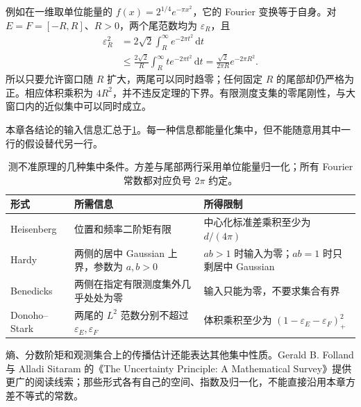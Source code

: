 例如在一维取单位能量的 \(f(x)=2^{1/4}e^{-\pi x^2}\)，它的 Fourier 变换等于自身。对 \(E=F=[-R,R]\)、\(R>0\)，两个尾范数均为 \(\varepsilon_R\)，且
\[
 \begin{aligned}
 \varepsilon_R^2
 &=2\sqrt2\int_R^\infty e^{-2\pi t^2}\,\mathrm dt\\
 &\leq\frac{2\sqrt2}{R}\int_R^\infty t e^{-2\pi t^2}\,\mathrm dt
 =\frac{\sqrt2}{2\pi R}e^{-2\pi R^2}.
 \end{aligned}
\]
所以只要允许窗口随 \(R\) 扩大，两尾可以同时趋零；任何固定 \(R\) 的尾部却仍严格为正。相应体积乘积为 \(4R^2\)，并不违反定理的下界。有限测度支集的零尾刚性，与大窗口内的近似集中可以同时成立。

\ProseParagraphBreak

本章各结论的输入信息汇总于\cref{b2:tab:20-uncertainty-forms}。每一种信息都能量化集中，但不能随意用其中一行的假设替代另一行。

\begin{table}[htbp]
\centering
\caption[测不准原理的几种集中条件]{测不准原理的几种集中条件。方差与尾部两行采用单位能量归一化；所有 Fourier 常数都对应负号 \(2\pi\) 约定。}
\label{b2:tab:20-uncertainty-forms}
\begin{tabularx}{\textwidth}{@{}p{6em}p{12em}X@{}}
\toprule
形式 & 所需信息 & 所得限制 \\
\midrule
Heisenberg & 位置和频率二阶矩有限 & 中心化标准差乘积至少为 \(d/(4\pi)\) \\
Hardy & 两侧的居中 Gaussian 上界，参数为 \(a,b>0\) & \(ab>1\) 时输入为零；\(ab=1\) 时只剩居中 Gaussian \\
Benedicks & 两侧在指定有限测度集外几乎处处为零 & 输入只能为零，不要求集合有界 \\
Donoho--Stark & 两尾的 \(L^2\) 范数分别不超过 \(\varepsilon_E,\varepsilon_F\) & 体积乘积至少为 \((1-\varepsilon_E-\varepsilon_F)_+^2\) \\
\bottomrule
\end{tabularx}
\end{table}

熵、分数阶矩和观测集合上的传播估计还能表达其他集中性质。Gerald B. Folland 与 Alladi Sitaram 的《The Uncertainty Principle: A Mathematical Survey》\cite{Folland1997Uncertainty}提供更广的阅读线索；那些形式各有自己的空间、指数及归一化，不能直接沿用本章方差不等式的常数。

